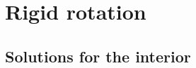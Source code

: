 \documentclass[12pt]{article}
\begin{document}





\section{Rigid rotation}\label{sec:rigidrot}

\subsection{Solutions for the interior}\label{sec:rotint}
\end{document}
